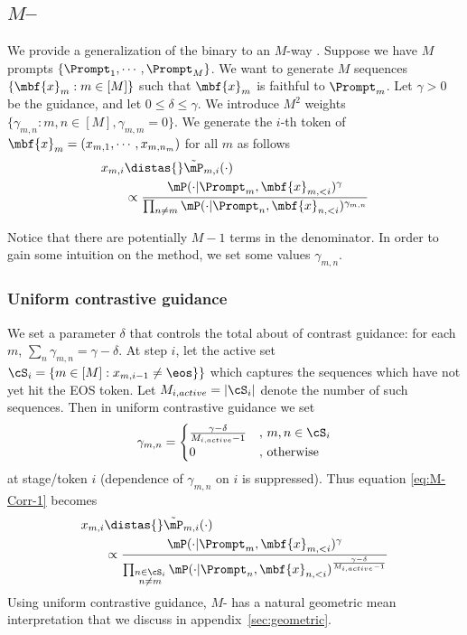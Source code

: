 \subsection{$M$--\corrsyn}
\label{sec:M-corrsyn}
We provide a generalization of the binary \corrsyn{} to an $M$-way \corrsyn{}. Suppose we have $M$ prompts $\{\Prompt_1,\cdots,\Prompt_M\}$. We want to generate $M$ sequences $\{\mbf{x}_m:m\in [M]\}$ such that $\mbf{x}_m$ is faithful to $\Prompt_m$. Let $\gamma>0$ be the guidance, and let $0\leq \delta\leq \gamma$. We introduce $M^2$ weights $\{\gamma_{m,n}:m,n\in[M], \gamma_{m,m}=0\}$. We generate the $i$-th token of $\mbf{x}_m=(x_{m,1},\cdots,x_{m,n_m})$ for all $m$ as follows
\begin{align}
     x_{m,i}&\distas{}\tilde \mP_{m,i}(\cdot)\nonumber\\
    &\propto \frac{\mP(\cdot| \Prompt_m,\mbf{x}_{m,<i})^{\gamma}}{\prod_{n\neq m}\mP(\cdot| \Prompt_n,\mbf{x}_{n,<i})^{\gamma_{m,n}}}\label{eq:M-Corr-1}
\end{align}

Notice that there are potentially $M-1$ terms in the denominator. In order to gain some intuition on the method, we set some values $\gamma_{m,n}$.
\subsubsection{Uniform contrastive guidance}
\label{sec:unif_guidance}
We set a parameter $\delta$ that controls the total about of contrast guidance: for each $m$, $\sum_n \gamma_{m,n}=\gamma-\delta$.
At step $i$, let the active set $\cS_{i}=\{m\in[M]:x_{m,i-1}\neq \eos\}\}$ which captures the sequences which have not yet hit the EOS token. Let $M_{i,active}=|\cS_{i}|$ denote the number of such sequences. Then in uniform contrastive guidance we set 
$$\gamma_{m,n}=\begin{cases} \frac{\gamma-\delta}{M_{i,active}-1}&,\, m,n\in\cS_i\\
 0&,\, \mathrm{otherwise}\end{cases}$$
at stage/token $i$ (dependence of $\gamma_{m,n}$ on $i$ is suppressed). Thus equation \eqref{eq:M-Corr-1} becomes
\begin{align}
    x_{m,i}&\distas{} \tilde \mP_{m,i}(\cdot)\nonumber\\
    &\propto \frac{\mP(\cdot| \Prompt_m,\mbf{x}_{m,<i})^{\gamma}}{\prod_{\substack{n\in \cS_i \\n\neq  m}}\mP(\cdot| \Prompt_n,\mbf{x}_{n,<i})^{\frac{\gamma-\delta}{M_{i,active}-1}}}\label{eq:M-Corr-2}
\end{align}
Using uniform contrastive guidance, $M$-\corrsyn{} has a natural geometric mean interpretation that we discuss in appendix~\ref{sec:geometric}. 


